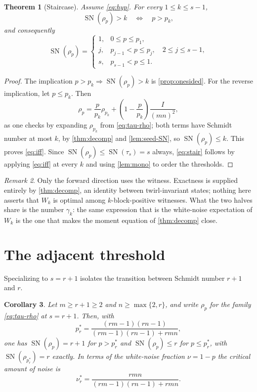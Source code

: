 \documentclass[11pt,reqno]{amsart}
\theoremstyle{plain}
\newtheorem{theorem}{Theorem}[section]
\newtheorem{corollary}[theorem]{Corollary}
\theoremstyle{remark}
\newtheorem{remark}[theorem]{Remark}
\DeclareMathOperator{\SN}{SN}
\begin{document}
\begin{theorem}[Staircase]
\label{thm:staircase}
Assume \cref{eq:hyp}.  For every $1\le k\le s-1$,
\begin{equation}
\label{eq:iff}
    \SN(\rho_p)>k
    \quad\Longleftrightarrow\quad
    p>p_k ,
\end{equation}
and consequently
\begin{equation}
\label{eq:stair}
    \SN(\rho_p)
    =
    \begin{cases}
    1,&0\le p\le p_1,\\
    j,&p_{j-1}<p\le p_j,\quad 2\le j\le s-1,\\
    s,&p_{s-1}<p\le1 .
    \end{cases}
\end{equation}
\end{theorem}

\begin{proof}
The implication $p>p_k\Rightarrow\SN(\rho_p)>k$ is
\cref{prop:onesided}.  For the reverse implication, let
$p\le p_k$.  Then
\[
    \rho_p
    =\frac p{p_k}\rho_{p_k}+\left(1-\frac p{p_k}\right)\frac I{(mn)^2},
\]
as one checks by expanding $\rho_{p_k}$ from \cref{eq:tau-rho}; both terms have
Schmidt number at most $k$, by \cref{thm:decomp} and \cref{lem:seed-SN}, so
$\SN(\rho_p)\le k$.  This proves \cref{eq:iff}.  Since
$\SN(\rho_p)\le\SN(\tau_s)=s$ always, \cref{eq:stair} follows by applying
\cref{eq:iff} at every $k$ and using \cref{lem:mono} to order the thresholds.
\end{proof}

\begin{remark}
\label{rem:whyexact}
Only the forward direction uses the witness.  Exactness is supplied entirely by
\cref{thm:decomp}, an identity between twirl-invariant states; nothing here
asserts that $W_k$ is optimal among $k$-block-positive witnesses.  What the two
halves share is the number $\gamma_k$: the same expression that is the
white-noise expectation of $W_k$ is the one that makes the moment equation of
\cref{thm:decomp} close.
\end{remark}

\section{The adjacent threshold}

Specializing to $s=r+1$ isolates the transition between Schmidt number $r+1$
and $r$.

\begin{corollary}
\label{cor:adjacent}
Let $m\ge r+1\ge2$ and $n\ge\max\{2,r\}$, and write $\rho_p$ for the family
\cref{eq:tau-rho} at $s=r+1$.  Then, with
\begin{equation}
\label{eq:pstar}
    p_r^*=\frac{(rm-1)(rn-1)}{(rm-1)(rn-1)+rmn},
\end{equation}
one has $\SN(\rho_p)=r+1$ for $p>p_r^*$ and $\SN(\rho_p)\le r$ for
$p\le p_r^*$, with $\SN(\rho_{p_r^*})=r$ exactly.  In terms of the white-noise
fraction $\nu=1-p$ the critical amount of noise is
\begin{equation}
\label{eq:nustar}
    \nu_r^*=\frac{rmn}{(rm-1)(rn-1)+rmn} .
\end{equation}
\end{corollary}
\end{document}
